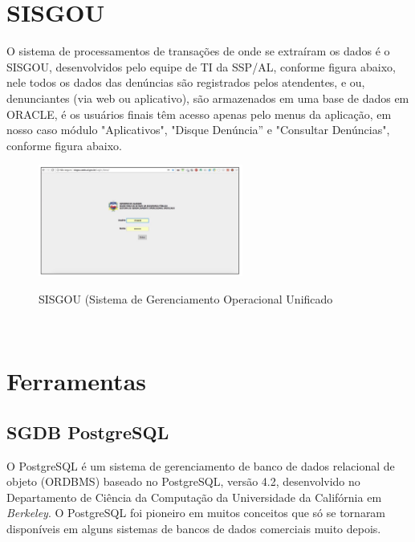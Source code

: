 \section{SISGOU}

O sistema de processamentos de transa\c{c}\~{o}es de onde se extra\'{i}ram os dados \'{e} o SISGOU, desenvolvidos pelo equipe de TI da SSP/AL, conforme figura abaixo, nele todos os dados das denúncias s\~{a}o registrados pelos atendentes, e ou, denunciantes (via web ou aplicativo), s\~{a}o armazenados em uma base de dados em ORACLE, \'{e} os usu\'{a}rios finais têm acesso apenas pelo menus da aplica\c{c}\~{a}o, em nosso caso m\'odulo "Aplicativos", "Disque Denúncia'' e "Consultar Denúncias", conforme figura abaixo.

\begin{figure}[H]
	\vspace*{0,2cm}
    \centering
    \caption{SISGOU (Sistema de Gerenciamento Operacional Unificado}
    \includegraphics[width=0.6\textwidth]{./04-figuras/figura-13}
    \label{fig:ilustfig13}
\end{figure}
\vspace*{-0,9cm}
{\raggedright {}}\\


\section{Ferramentas}


\subsection{SGDB PostgreSQL}

O PostgreSQL \'{e} um sistema de gerenciamento de banco de dados relacional de objeto (ORDBMS) baseado no PostgreSQL, vers\~{a}o 4.2, desenvolvido no Departamento de Ciência da Computa\c{c}\~{a}o da Universidade da Calif\'ornia em \textit{Berkeley}. O PostgreSQL foi pioneiro em muitos conceitos que s\'o se tornaram dispon\'{i}veis em alguns sistemas de bancos de dados comerciais muito depois.

